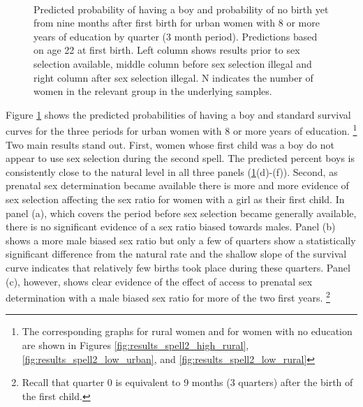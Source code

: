 \documentclass[12pt,letterpaper]{article}
\begin{document}
\begin{figure}[htpb]
{\begin{minipage}{0.31\textwidth}
        \captionsetup[subfigure]{labelformat=empty,position=top,captionskip=-1pt,farskip=-0.5pt}
        \\
        \captionsetup[subfigure]{labelformat=parens}
    \end{minipage}
}
\setcounter{subfigure}{3}
\caption{Predicted probability of having a boy and probability of
no birth yet from nine months after first birth for urban 
women with 8 or more years of education by quarter (3 month period). 
Predictions based on age 22 at first birth.
Left column shows results prior to sex selection available, middle column before
sex selection illegal and right column after sex selection illegal.
N indicates the number of women in the relevant group in the underlying samples.
}
\label{fig:results_spell2_high_urban}
\end{figure}

Figure \ref{fig:results_spell2_high_urban} 
shows the predicted probabilities of having a boy and standard survival curves
for the three periods for urban women with 8 or more years of education.%
\footnote{
The corresponding graphs for rural women and for women with no education are
shown in Figures \ref{fig:results_spell2_high_rural}, \ref{fig:results_spell2_low_urban},
and \ref{fig:results_spell2_low_rural}
}
Two main results stand out.
First, women whose first child was a boy do not appear to use sex selection during
the second spell.
The predicted percent boys is consistently close to the natural level in all three
panels (\ref{fig:results_spell2_high_urban}(d)-(f)).
Second, as prenatal sex determination became available there is more and more
evidence of sex selection affecting the sex ratio for women with a girl as their
first child.
In panel (a), which covers the period before sex selection became generally
available, there is no significant evidence of a sex ratio biased towards males.
Panel (b) shows a more male biased sex ratio but only a few of quarters show
a statistically significant difference from the natural rate and the shallow 
slope of the survival curve indicates that relatively few births took place
during these quarters.
Panel (c), however, shows clear evidence of the effect of access to prenatal
sex determination with a male biased sex ratio for more of the two first years.%
\footnote{
Recall that quarter 0 is equivalent to 9 months (3 quarters) after the birth
of the first child.
}
\end{document}
